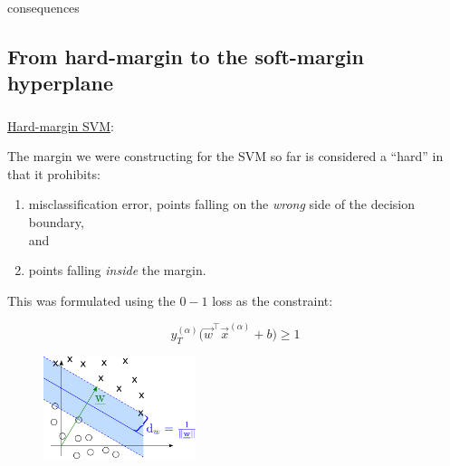 \begin{frame}
\begin{block}{consequences}
\begin{itemize}
		\end{itemize}
	\end{block}
\end{frame}

\subsection{From hard-margin to the soft-margin hyperplane}


\begin{frame}\frametitle{\subsecname}

\underline{Hard-margin SVM}:

The margin we were constructing for the SVM so far is considered a ``hard'' in that it prohibits:
\begin{enumerate}
\item misclassification error, points falling on the \emph{wrong} side of the decision boundary,\\

and

\item points falling \emph{inside} the margin.
\end{enumerate}

This was formulated using the $0-1$ loss as the constraint:

\begin{equation}
y_T^{(\alpha)} \Big( \vec{w}^\top \vec{x}^{(\alpha)} + b \Big)
				\geq 1
\end{equation}

\begin{figure}[h]
	\centering
	\includegraphics[height=3cm]{img/margin_and_weights}%
    \label{fig:marginhard}%
\end{figure}

\end{frame}

